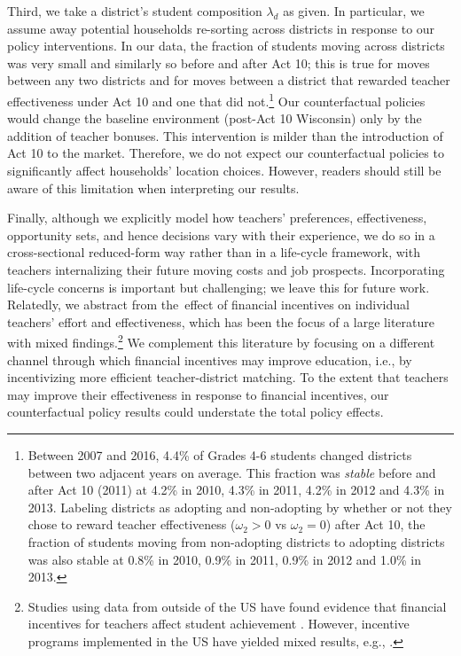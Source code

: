 \documentclass[notitlepage,12pt]{article}%
\begin{document}
Third, we take a district's student composition $\lambda_{d}$ as given. In
particular, we assume away potential households re-sorting across districts in
response to our policy interventions. In our data, the fraction of students
moving across districts was very small and similarly so before and after Act
10; this is true for moves between any two districts and for moves between a
district that rewarded teacher effectiveness under Act 10 and one that did
not.\footnote{Between 2007 and 2016, 4.4\% of Grades 4-6 students changed
districts between two adjacent years on average. This fraction was
\emph{stable} before and after Act 10 (2011) at 4.2\% in 2010, 4.3\% in 2011,
4.2\% in 2012 and 4.3\% in 2013. Labeling districts as adopting and
non-adopting by whether or not they chose to reward teacher effectiveness
($\omega_{2}>0$ vs $\omega_{2}=0$) after Act 10, the fraction of students
moving from non-adopting districts to adopting districts was also stable at
0.8\% in 2010, 0.9\% in 2011, 0.9\% in 2012 and 1.0\% in 2013.} Our
counterfactual policies would change the baseline environment (post-Act 10
Wisconsin) only by the addition of teacher bonuses. This intervention is
milder than the introduction of Act 10 to the market. Therefore, we do not
expect our counterfactual policies to significantly affect households'
location choices. However, readers should still be aware of this limitation
when interpreting our results.

Finally, although we explicitly model how teachers' preferences,
effectiveness, opportunity sets, and hence decisions vary with their
experience, we do so in a cross-sectional reduced-form way rather than in a
life-cycle framework, with teachers internalizing their future moving costs
and job prospects. Incorporating life-cycle concerns is important but
challenging; we leave this for future work. Relatedly, we abstract from
the\ effect of financial incentives on individual teachers' effort and
effectiveness, which has been the focus of a large literature with mixed
findings.\footnote{Studies using data from outside of the US have found
evidence that financial incentives for teachers affect student achievement
\citep{muralidharan2011teacher,duflo2012incentives,lavy2002evaluating,atkinson2009evaluating,glewwe2010teacher}.
However, incentive programs implemented in the US have yielded mixed results,
e.g.,
\citet{fryer2013teacher,imberman2015incentive,dee2015incentives,brehm2017achievement}.}
We complement this literature by focusing on a different channel through which
financial incentives may improve education, i.e., by incentivizing more
efficient teacher-district matching. To the extent that teachers may improve
their effectiveness in response to financial incentives, our counterfactual
policy results could understate the total policy effects.
\end{document}
